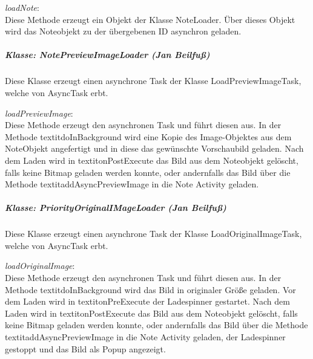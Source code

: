 \textit{loadNote}:\\
Diese Methode erzeugt ein Objekt der Klasse NoteLoader. Über dieses Objekt wird das Noteobjekt zu der übergebenen ID asynchron geladen.

\subparagraph{Klasse: NotePreviewImageLoader (Jan Beilfuß)}
Diese Klasse erzeugt einen asynchrone Task der Klasse LoadPreviewImageTask, welche von AsyncTask erbt.

\textit{loadPreviewImage}:\\
Diese Methode erzeugt den asynchronen Task und führt diesen aus. In der Methode textit{doInBackground} wird eine Kopie des Image-Objektes aus dem NoteObjekt angefertigt und in diese das gewünschte Vorschaubild geladen. Nach dem Laden wird in textit{onPostExecute} das Bild aus dem Noteobjekt gelöscht, falls keine Bitmap geladen werden konnte, oder andernfalls das Bild über die Methode textit{addAsyncPreviewImage} in die Note Activity geladen.

\subparagraph{Klasse: PriorityOriginalIMageLoader (Jan Beilfuß)}
Diese Klasse erzeugt einen asynchrone Task der Klasse LoadOriginalImageTask, welche von AsyncTask erbt.

\textit{loadOriginalImage}:\\
Diese Methode erzeugt den asynchronen Task und führt diesen aus. In der Methode textit{doInBackground} wird das Bild in originaler Größe geladen. Vor dem Laden wird in textit{onPreExecute} der Ladespinner gestartet. Nach dem Laden wird in textit{onPostExecute} das Bild aus dem Noteobjekt gelöscht, falls keine Bitmap geladen werden konnte, oder andernfalls das Bild über die Methode textit{addAsyncPreviewImage} in die Note Activity geladen, der Ladespinner gestoppt und das Bild als Popup angezeigt.

